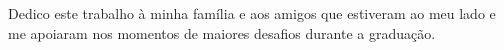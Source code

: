 Dedico este trabalho à minha família e aos amigos que estiveram ao meu lado e me apoiaram nos momentos de maiores desafios durante a graduação.